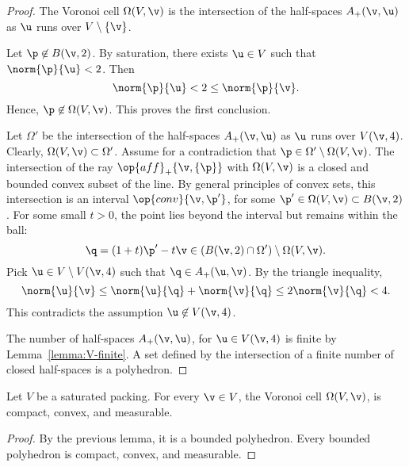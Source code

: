 \begin{proof} 
The Voronoi cell $\Omega(V,\v)$ is the
intersection of the half-spaces $A_+(\v,\u)$ as $\u$ runs over
$V\setminus \{\v\}$.

Let $\p\not\in B(\v,2)$.  
By saturation, there exists $\u\in V$ such that $\norm{\p}{\u}<2$.
Then 
\begin{displaymath} 
\norm{\p}{\u} < 2 \le \norm{\p}{\v}.
\end{displaymath}
Hence, $\p\not\in\Omega(V,\v)$.  This proves the first conclusion.


Let $\Omega'$ be the intersection of the half-spaces $A_+(\v,\u)$ as
$\u$ runs over $V(\v,4)$.  Clearly, $\Omega(V,\v)\subset \Omega'$.
Assume for a contradiction that $\p\in \Omega'\setminus\Omega(V,\v)$.
The intersection of the ray $\op{aff}_+\{\v,\{\p\}\}$ with
$\Omega(V,\v)$ is a closed and bounded convex subset of the line.  By
general principles of convex sets, this intersection is an interval
$\op{conv}\{\v,\p'\}$, for some $\p'\in\Omega(V,\v)\subset B(\v,2)$.
For some small $t>0$, the point lies beyond the interval but remains
within the ball:
\begin{displaymath} 
\q = (1+t)\p' -t \v\in (B(\v,2)\cap \Omega')\setminus \Omega(V,\v).
\end{displaymath}
Pick $\u\in V\setminus V(\v,4)$ such that $\q\in A_+(\u,\v)$.  By the
triangle inequality,
\begin{displaymath} 
\norm{\u}{\v} \le \norm{\u}{\q} + \norm{\v}{\q} \le 2\norm{\v}{\q} < 4.
\end{displaymath}
This contradicts the assumption $\u\not\in V(\v,4)$.

The number of half-spaces $A_+(\v,\u)$, for $\u\in V(\v,4)$ is finite by
Lemma~\ref{lemma:V-finite}.  A set defined by the intersection of a finite number
of closed half-spaces is a polyhedron.
\end{proof}

\begin{lemma}[] 
Let $ V$ be a saturated packing.  For every $\v\in  V$, 
the Voronoi cell $\Omega( V,\v)$,  is
compact, convex, and measurable.
\end{lemma}

\begin{proof}  By the previous lemma, it is a bounded polyhedron.  Every bounded
polyhedron is compact, convex, and measurable.
\end{proof}




